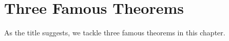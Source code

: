 \chapter{Three Famous Theorems}\label{chap:three famous theorems}

As the title suggests, we tackle three famous theorems in this chapter.